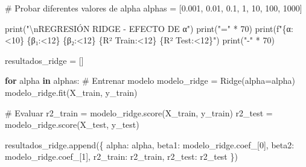 \documentclass[
  doc,
  floatsintext,
  longtable,
  a4paper,
  nolmodern,
  notxfonts,
  notimes,
  12pt,
  colorlinks=true,linkcolor=blue,citecolor=blue,urlcolor=blue]{apa7}
\newenvironment{Shaded}{\begin{snugshade}}{\end{snugshade}}
\newcommand{\BuiltInTok}[1]{\textcolor[rgb]{0.00,0.23,0.31}{#1}}
\newcommand{\CharTok}[1]{\textcolor[rgb]{0.13,0.47,0.30}{#1}}
\newcommand{\CommentTok}[1]{\textcolor[rgb]{0.37,0.37,0.37}{#1}}
\newcommand{\ControlFlowTok}[1]{\textcolor[rgb]{0.00,0.23,0.31}{\textbf{#1}}}
\newcommand{\DecValTok}[1]{\textcolor[rgb]{0.68,0.00,0.00}{#1}}
\newcommand{\FloatTok}[1]{\textcolor[rgb]{0.68,0.00,0.00}{#1}}
\newcommand{\KeywordTok}[1]{\textcolor[rgb]{0.00,0.23,0.31}{\textbf{#1}}}
\newcommand{\NormalTok}[1]{\textcolor[rgb]{0.00,0.23,0.31}{#1}}
\newcommand{\OperatorTok}[1]{\textcolor[rgb]{0.37,0.37,0.37}{#1}}
\newcommand{\SpecialCharTok}[1]{\textcolor[rgb]{0.37,0.37,0.37}{#1}}
\newcommand{\SpecialStringTok}[1]{\textcolor[rgb]{0.13,0.47,0.30}{#1}}
\newcommand{\StringTok}[1]{\textcolor[rgb]{0.13,0.47,0.30}{#1}}
\begin{document}
\begin{Shaded}
\begin{Highlighting}[]
\CommentTok{\# Probar diferentes valores de alpha}
\NormalTok{alphas }\OperatorTok{=}\NormalTok{ [}\FloatTok{0.001}\NormalTok{, }\FloatTok{0.01}\NormalTok{, }\FloatTok{0.1}\NormalTok{, }\DecValTok{1}\NormalTok{, }\DecValTok{10}\NormalTok{, }\DecValTok{100}\NormalTok{, }\DecValTok{1000}\NormalTok{]}

\BuiltInTok{print}\NormalTok{(}\StringTok{"}\CharTok{\textbackslash{}n}\StringTok{REGRESIÓN RIDGE {-} EFECTO DE α"}\NormalTok{)}
\BuiltInTok{print}\NormalTok{(}\StringTok{"="} \OperatorTok{*} \DecValTok{70}\NormalTok{)}
\BuiltInTok{print}\NormalTok{(}\SpecialStringTok{f"}\SpecialCharTok{\{}\StringTok{\textquotesingle{}α\textquotesingle{}}\SpecialCharTok{:\textless{}10\}}\SpecialStringTok{ }\SpecialCharTok{\{}\StringTok{\textquotesingle{}β₁\textquotesingle{}}\SpecialCharTok{:\textless{}12\}}\SpecialStringTok{ }\SpecialCharTok{\{}\StringTok{\textquotesingle{}β₂\textquotesingle{}}\SpecialCharTok{:\textless{}12\}}\SpecialStringTok{ }\SpecialCharTok{\{}\StringTok{\textquotesingle{}R² Train\textquotesingle{}}\SpecialCharTok{:\textless{}12\}}\SpecialStringTok{ }\SpecialCharTok{\{}\StringTok{\textquotesingle{}R² Test\textquotesingle{}}\SpecialCharTok{:\textless{}12\}}\SpecialStringTok{"}\NormalTok{)}
\BuiltInTok{print}\NormalTok{(}\StringTok{"{-}"} \OperatorTok{*} \DecValTok{70}\NormalTok{)}

\NormalTok{resultados\_ridge }\OperatorTok{=}\NormalTok{ []}

\ControlFlowTok{for}\NormalTok{ alpha }\KeywordTok{in}\NormalTok{ alphas:}
    \CommentTok{\# Entrenar modelo}
\NormalTok{    modelo\_ridge }\OperatorTok{=}\NormalTok{ Ridge(alpha}\OperatorTok{=}\NormalTok{alpha)}
\NormalTok{    modelo\_ridge.fit(X\_train, y\_train)}
    
    \CommentTok{\# Evaluar}
\NormalTok{    r2\_train }\OperatorTok{=}\NormalTok{ modelo\_ridge.score(X\_train, y\_train)}
\NormalTok{    r2\_test }\OperatorTok{=}\NormalTok{ modelo\_ridge.score(X\_test, y\_test)}
    
\NormalTok{    resultados\_ridge.append(\{}
        \StringTok{\textquotesingle{}alpha\textquotesingle{}}\NormalTok{: alpha,}
        \StringTok{\textquotesingle{}beta1\textquotesingle{}}\NormalTok{: modelo\_ridge.coef\_[}\DecValTok{0}\NormalTok{],}
        \StringTok{\textquotesingle{}beta2\textquotesingle{}}\NormalTok{: modelo\_ridge.coef\_[}\DecValTok{1}\NormalTok{],}
        \StringTok{\textquotesingle{}r2\_train\textquotesingle{}}\NormalTok{: r2\_train,}
        \StringTok{\textquotesingle{}r2\_test\textquotesingle{}}\NormalTok{: r2\_test}
\NormalTok{    \})}
    

\end{Highlighting}
\end{Shaded}
\end{document}
